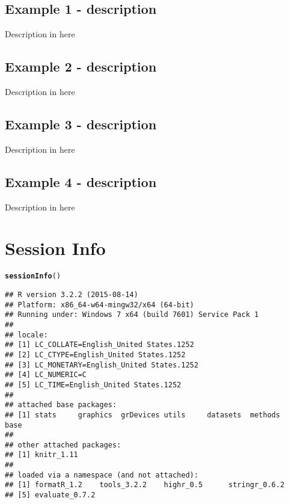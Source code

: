 \documentclass{article}\usepackage[]{graphicx}\usepackage[]{color}
\makeatletter
\newcommand{\hlstd}[1]{\textcolor[rgb]{0.345,0.345,0.345}{#1}}%
\newcommand{\hlkwd}[1]{\textcolor[rgb]{0.737,0.353,0.396}{\textbf{#1}}}%
\newenvironment{kframe}{%
 \def\at@end@of@kframe{}%
 \ifinner\ifhmode%
  \def\at@end@of@kframe{\end{minipage}}%
  \begin{minipage}{\columnwidth}%
 \fi\fi%
 \def\FrameCommand##1{\hskip\@totalleftmargin \hskip-\fboxsep
 \colorbox{shadecolor}{##1}\hskip-\fboxsep
     \hskip-\linewidth \hskip-\@totalleftmargin \hskip\columnwidth}%
 \MakeFramed {\advance\hsize-\width
   \@totalleftmargin\z@ \linewidth\hsize
   \@setminipage}}%
 {\par\unskip\endMakeFramed%
 \at@end@of@kframe}
\newenvironment{knitrout}{}{} %
\makeatother
\begin{document}
\subsection{Example 1 - description}
Description in here
\subsection{Example 2 - description}
Description in here
\subsection{Example 3 - description}
Description in here
\subsection{Example 4 - description}
Description in here









\section{Session Info}
\begin{knitrout}
\color{fgcolor}\begin{kframe}
\begin{alltt}
\hlkwd{sessionInfo}\hlstd{()}
\end{alltt}
\begin{verbatim}
## R version 3.2.2 (2015-08-14)
## Platform: x86_64-w64-mingw32/x64 (64-bit)
## Running under: Windows 7 x64 (build 7601) Service Pack 1
## 
## locale:
## [1] LC_COLLATE=English_United States.1252 
## [2] LC_CTYPE=English_United States.1252   
## [3] LC_MONETARY=English_United States.1252
## [4] LC_NUMERIC=C                          
## [5] LC_TIME=English_United States.1252    
## 
## attached base packages:
## [1] stats     graphics  grDevices utils     datasets  methods   base     
## 
## other attached packages:
## [1] knitr_1.11
## 
## loaded via a namespace (and not attached):
## [1] formatR_1.2    tools_3.2.2    highr_0.5      stringr_0.6.2 
## [5] evaluate_0.7.2
\end{verbatim}
\end{kframe}
\end{knitrout}

\printbibliography[heading=bibintoc] 
\end{document}
